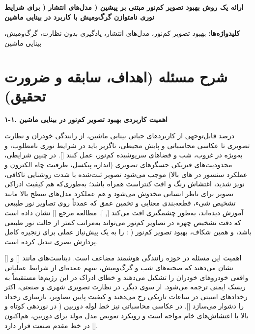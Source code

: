 \documentclass[12pt,a4paper]{article}
\begin{document}
\begin{center}
{\Large \textbf{ارائه یک روش بهبود تصویر کم‌نور مبتنی بر پیشین ( مدل‌های انتشار ( برای شرایط نوری نامتوازن گرگ‌ومیش با کاربرد در بینایی ماشین}}\\[6pt]
{\normalsize {}}
\end{center}
\noindent\textbf{کلیدواژه‌ها:} بهبود تصویر کم‌نور، مدل‌های انتشار، یادگیری بدون نظارت، گرگ‌ومیش، بینایی ماشین\\
\noindent\textbf{} 


\section{شرح مسئله (اهداف، سابقه و ضرورت تحقیق)}
\textbf{۱-۱. اهمیت کاربردی بهبود تصویر کم‌نور در بینایی ماشین}\par
درصد قابل‌توجهی از کاربردهای حیاتی بینایی ماشین، از رانندگی خودران و نظارت تصویری تا عکاسی محاسباتی و پایش محیطی، ناگزیر باید در شرایط نوری نامطلوب، و به‌ویژه در غروب، شب و فضاهای سرپوشیده کم‌نور، عمل کنند []. در چنین شرایطی، محدودیت‌های فیزیکی حسگرهای تصویری (اندازه پیکسل، ظرفیت چاه الکترون و عملکرد سنسور در های بالا) موجب می‌شود تصویر ثبت‌شده با شدت روشنایی ناکافی، نویز شدید، اغتشاش رنگ و افت کنتراست همراه باشد؛ به‌طوری‌که هم کیفیت ادراکی تصویر برای ناظر انسانی مخدوش می‌شود و هم عملکرد مدل‌های سطح بالا مانند تشخیص شیء، قطعه‌بندی معنایی و تخمین عمق که عمدتاً روی تصاویر نور طبیعی آموزش دیده‌اند، به‌طور چشمگیری افت می‌کند [, ]. مطالعه مرجع [] نشان داده است که دقت تشخیص چهره در تصاویر کم‌نور می‌تواند به‌مراتب کمتر از حالت نور طبیعی باشد، و همین شکاف، بهبود تصویر کم‌نور (  :  را به یک پیش‌نیاز عملی برای زنجیره کامل پردازش بصری تبدیل کرده است.\par
اهمیت این مسئله در حوزه رانندگی هوشمند مضاعف است. دیتاست‌های  مانند  [] و  [] نشان می‌دهند که صحنه‌های شب و گرگ‌ومیش، سهم عمده‌ای از شرایط عملیاتی واقعی خودروهای خودران را تشکیل می‌دهند و خطای ادراک در این رژیم‌ها مستقیماً به ریسک ایمنی ترجمه می‌شود. از سوی دیگر، در نظارت تصویری شهری و صنعتی، اکثر رخدادهای امنیتی در ساعات تاریکی رخ می‌دهند و کیفیت پایین تصاویر، بازسازی رخداد را دشوار می‌سازد []. در عکاسی محاسباتی نیز خط لوله دوربین ( در نوردهی کوتاه و  بالا با اغتشاش‌های خام مواجه است و رویکرد تعویض مدل مولد برای  دوربین، هم‌اکنون در خط مقدم صنعت قرار دارد [].\par
\end{document}

